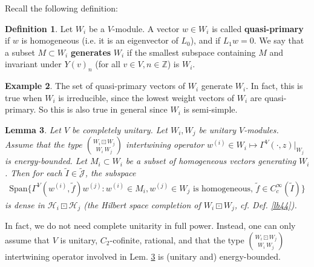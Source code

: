 \documentclass[11pt,b5paper,notitlepage]{article}
\theoremstyle{definition}
\newtheorem{df}{Definition}[section]
\newtheorem{eg}[df]{Example}
\theoremstyle{plain}
\newtheorem{lm}[df]{Lemma}
\newcommand{\mc}{\mathcal}
\newcommand{\wtd}{\widetilde}
\newcommand{\Span}{\mathrm{Span}}
\newcommand{\Jtd}{\widetilde{\mathcal J}}
\newcommand{\Zbb}{\mathbb Z}
\numberwithin{equation}{section}
\begin{document}
Recall the following definition:

\begin{df}
Let $W_i$ be a $V$-module. A vector $w\in W_i$ is called \textbf{quasi-primary} if $w$ is homogeneous (i.e. it is an eigenvector of $L_0$), and if $L_1w=0$. We say that a subset $M\subset W_i$ \textbf{generates} $W_i$ if the smallest subspace containing $M$ and invariant under $Y(v)_n$ (for all $v\in V,n\in\Zbb$) is $W_i$. 
\end{df}


\begin{eg}
The set of quasi-primary vectors of $W_i$ generate $W_i$. In fact, this is true when $W_i$ is irreducible, since the lowest weight vectors of $W_i$ are quasi-primary. So this is also true in general since $W_i$ is semi-simple.
\end{eg}




\begin{lm}\label{lb45}
Let $V$ be completely unitary. Let $W_i,W_j$ be unitary $V$-modules. Assume that the type $W_i\boxdot W_j\choose W_i~W_j$ intertwining operator $w^{(i)}\in W_i\mapsto \Gamma^V(\cdot,z)|_{W_j}$ is energy-bounded. Let $M_i\subset W_i$ be a subset of homogeneous vectors generating $W_i$. Then for each $\wtd I\in\Jtd$, the subspace
\begin{align}\label{eq39}
\Span\{\Gamma^V(w^{(i)},\wtd f)w^{(j)}:w^{(i)}\in M_i,w^{(j)}\in W_j\text{ is homogeneous, }\wtd f\in C_c^\infty(\wtd I)\}
\end{align}
is dense in $\mc H_i\boxdot\mc H_j$ (the Hilbert space completion of $W_i\boxdot W_j$, cf. Def. \ref{lb44}).
\end{lm}

In fact, we do not need complete unitarity in full power. Instead, one can only assume that $V$ is unitary, $C_2$-cofinite, rational, and that the type $W_i\boxdot W_j\choose W_i~W_j$ intertwining operator involved in Lem. \ref{lb45} is (unitary and) energy-bounded.
\end{document}
